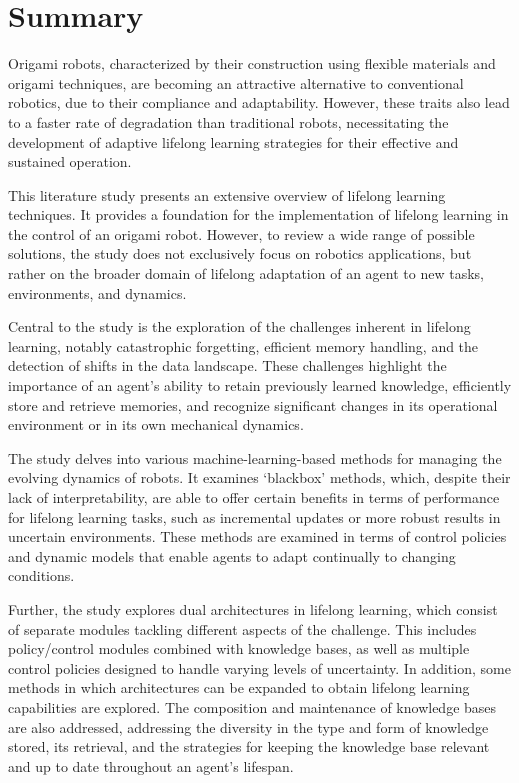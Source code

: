 \chapter*{Summary}

Origami robots, characterized by their construction using flexible materials and origami techniques, are becoming an attractive alternative to conventional robotics, due to their compliance and adaptability.
However, these traits also lead to a faster rate of degradation than traditional robots, necessitating the development of adaptive lifelong learning strategies for their effective and sustained operation.

This literature study presents an extensive overview of lifelong learning techniques.
It provides a foundation for the implementation of lifelong learning in the control of an origami robot.
However, to review a wide range of possible solutions, the study does not exclusively focus on robotics applications, but rather on the broader domain of lifelong adaptation of an agent to new tasks, environments, and dynamics.

Central to the study is the exploration of the challenges inherent in lifelong learning, notably catastrophic forgetting, efficient memory handling, and the detection of shifts in the data landscape.
These challenges highlight the importance of an agent's ability to retain previously learned knowledge, efficiently store and retrieve memories, and recognize significant changes in its operational environment or in its own mechanical dynamics.

The study delves into various machine-learning-based methods for managing the evolving dynamics of robots.
It examines `blackbox' methods, which, despite their lack of interpretability, are able to offer certain benefits in terms of performance for lifelong learning tasks, such as incremental updates or more robust results in uncertain environments.
These methods are examined in terms of control policies and dynamic models that enable agents to adapt continually to changing conditions.

Further, the study explores dual architectures in lifelong learning, which consist of separate modules tackling different aspects of the challenge.
This includes policy/control modules combined with knowledge bases, as well as multiple control policies designed to handle varying levels of uncertainty.
In addition, some methods in which architectures can be expanded to obtain lifelong learning capabilities are explored.
The composition and maintenance of knowledge bases are also addressed, addressing the diversity in the type and form of knowledge stored, its retrieval, and the strategies for keeping the knowledge base relevant and up to date throughout an agent's lifespan.


